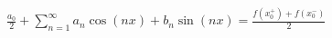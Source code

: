 \documentclass[preview]{standalone}
\begin{document}
\begin{center}
$\displaystyle{\frac{a_0}{2}+\sum\limits_{n=1}^{\infty}a_n\cos{(nx)}+b_n\sin{(nx)}=\frac{f(x_0^+)+f(x_0^-)}{2}}$
\end{center}
\end{document}
